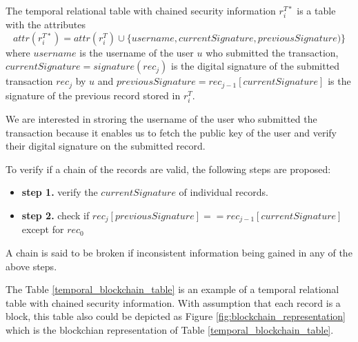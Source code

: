 			\begin{defn}
				The temporal relational table with chained security information $r_i^{T*}$ is a table with the attributes $$attr(r_i^{T*}) = attr(r_i^T) \cup \{username,currentSignature, previousSignature)\}$$ where $username$ is the username of the user $u$ who submitted the transaction, $currentSignature = signature(rec_j)$ is the digital signature of the submitted transaction $rec_j$ by $u$ and $previousSignature = rec_{j-1}[currentSignature]$ is the signature of the previous record stored in $r_i^T$. 
			\label{defn:temporal_blockchain}
			\end{defn}

			We are interested in stroring the username of the user who submitted the transaction because it enables us to fetch the public key of the user and verify their digital signature on the submitted record.

			\begin{defn}
				To verify if a chain of the records are valid, the following steps are proposed:
				\begin{itemize}
					\item \textbf{step 1.} verify the $currentSignature$ of individual records.
					\item \textbf{step 2.} check if $rec_j[previousSignature] == rec_{j-1}[currentSignature]$ except for $rec_0$
				\end{itemize}
			\label{chain_verification}
			\end{defn}
			A chain is said to be broken if inconsistent information being gained in any of the above steps.

			\begin{example} 
				The Table \ref{temporal_blockchain_table} is an example of a temporal relational table with chained security information. With assumption that each record is a block, this table also could be depicted as Figure \ref{fig:blockchain_representation} which is the blockchian representation of Table \ref{temporal_blockchain_table}.
			\label{example:blockchain}
			\end{example}

